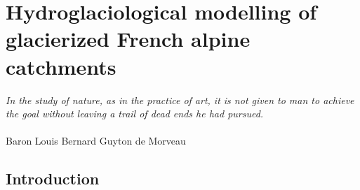 \chapter{Hydroglaciological modelling of glacierized French alpine catchments}
\label{chap:discussion}

\begin{flushright}
\begin{small}
\textit{In the study of nature, as in the practice of art, it is not given to man to achieve the goal without leaving a trail of dead ends he had pursued.}\\ \\
Baron Louis Bernard Guyton de Morveau
\end{small}
\end{flushright}

\section{Introduction}

